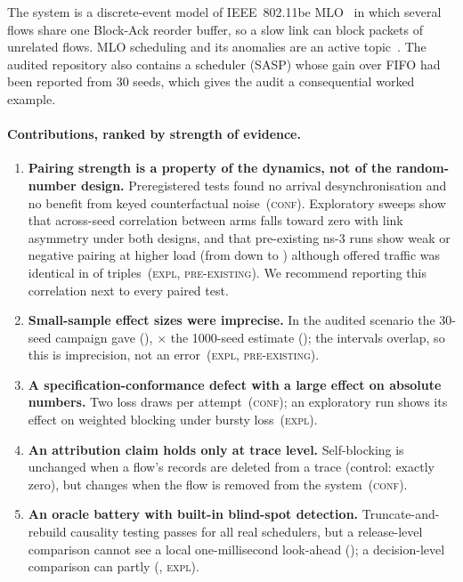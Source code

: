 \documentclass[11pt]{article}
\newcommand{\tagC}{\textsc{conf}}
\newcommand{\tagE}{\textsc{expl}}
\newcommand{\tagP}{\textsc{pre-existing}}
\begin{document}
The system is a discrete-event model of IEEE~802.11be MLO~\cite{ieee80211be2024} in which several flows share one Block-Ack reorder buffer, so a slow link can block packets of unrelated flows.
MLO scheduling and its anomalies are an active topic~\cite{lopezraventos2022mlo,carrascosa2023understanding}.
The audited repository also contains a scheduler (SASP) whose gain over FIFO had been reported from 30 seeds, which gives the audit a consequential worked example.

\paragraph{Contributions, ranked by strength of evidence.}
\begin{enumerate}
  \item \textbf{Pairing strength is a property of the dynamics, not of the random-number design.} Preregistered tests found no arrival desynchronisation and no benefit from keyed counterfactual noise~(\tagC). Exploratory sweeps show that across-seed correlation between arms falls toward zero with link asymmetry under both designs, and that pre-existing ns-3 runs show weak or negative pairing at higher load (from \XFiveRhoMax{} down to \XFiveRhoMin{}) although offered traffic was identical in \XFiveIdentical{} of \XFiveTriples{} triples~(\tagE{}, \tagP{}). We recommend reporting this correlation next to every paired test.
  \item \textbf{Small-sample effect sizes were imprecise.} In the audited scenario the 30-seed campaign gave \OldD{} (\OldDCI{}), \OldRatio{}$\times$ the 1000-seed estimate \XFourDShared{} (\XFourCIShared{}); the intervals overlap, so this is imprecision, not an error~(\tagE{}, \tagP{}).
  \item \textbf{A specification-conformance defect with a large effect on absolute numbers.} Two loss draws per attempt~(\tagC{}); an exploratory run shows its effect on weighted blocking under bursty loss~(\tagE{}).
  \item \textbf{An attribution claim holds only at trace level.} Self-blocking is unchanged when a flow's records are deleted from a trace (control: exactly zero), but changes when the flow is removed from the system~(\tagC{}).
  \item \textbf{An oracle battery with built-in blind-spot detection.} Truncate-and-rebuild causality testing passes for all real schedulers, but a release-level comparison cannot see a local one-millisecond look-ahead (\HSixLeakyLocal{}); a decision-level comparison can partly (\XThreeLeakyLocal{}, \tagE{}).
\end{enumerate}
\end{document}
